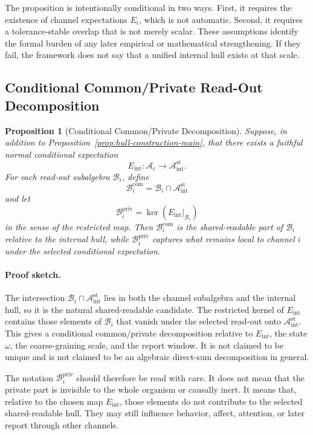 \documentclass[12pt]{article}
\newtheorem{proposition}{Proposition}[section]
\theoremstyle{definition}
\theoremstyle{remark}
\newcommand{\Ac}{\mathcal A_c}
\newcommand{\Bint}{\mathcal A_{\mathrm{int}}^{\mathrm{st}}}
\begin{document}
The proposition is intentionally conditional in two ways. First, it
requires the existence of channel expectations \(E_i\), which is not
automatic. Second, it requires a tolerance-stable overlap that is not
merely scalar. These assumptions identify the formal burden of any later
empirical or mathematical strengthening. If they fail, the framework
does not say that a unified internal hull exists at that scale.

\subsection{Conditional Common/Private Read-Out Decomposition}

\begin{proposition}[Conditional Common/Private Decomposition]
\label{prop:common-private-main}
Suppose, in addition to Proposition~\ref{prop:hull-construction-main},
that there exists a faithful normal conditional expectation
\[
E_{\mathrm{int}}:\Ac\to\Bint.
\]
For each read-out subalgebra \(\mathcal B_i\), define
\[
\mathcal B_i^{\mathrm{com}}
=
\mathcal B_i\cap\Bint
\]
and let
\[
\mathcal B_i^{\mathrm{priv}}
=
\ker(E_{\mathrm{int}}|_{\mathcal B_i})
\]
in the sense of the restricted map. Then
\(\mathcal B_i^{\mathrm{com}}\) is the shared-readable part of
\(\mathcal B_i\) relative to the internal hull, while
\(\mathcal B_i^{\mathrm{priv}}\) captures what remains local to channel
\(i\) under the selected conditional expectation.
\end{proposition}

\paragraph{Proof sketch.}
The intersection \(\mathcal B_i\cap\Bint\) lies in both the channel
subalgebra and the internal hull, so it is the natural shared-readable
candidate. The restricted kernel of \(E_{\mathrm{int}}\) contains those
elements of \(\mathcal B_i\) that vanish under the selected read-out
onto \(\Bint\). This gives a conditional common/private decomposition
relative to \(E_{\mathrm{int}}\), the state \(\omega\), the
coarse-graining scale, and the report window. It is not claimed to be
unique and is not claimed to be an algebraic direct-sum decomposition in
general.

The notation \(\mathcal B_i^{\mathrm{priv}}\) should therefore be read
with care. It does not mean that the private part is invisible to the
whole organism or causally inert. It means that, relative to the chosen
map \(E_{\mathrm{int}}\), those elements do not contribute to the
selected shared-readable hull. They may still influence behavior,
affect, attention, or later report through other channels.
\end{document}
